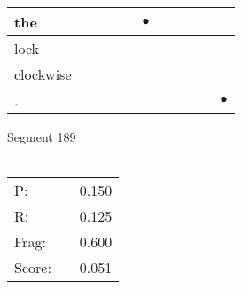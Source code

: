 \documentclass[landscape]{article}
\newcommand{\ssp}{\hspace{2pt}}
\newcommand{\mex}{\cellcolor{g}$\bullet$}
\begin{document}
\begin{tabular}{|l|p{10pt}|p{10pt}|p{10pt}|p{10pt}|p{10pt}|p{10pt}|p{10pt}|p{10pt}|p{10pt}|p{10pt}|}
\hline
\ssp \cellcolor{ref4}the \ssp&\hspace{2pt}&\hspace{2pt}&\hspace{2pt}&\hspace{2pt}&\hspace{2pt}\mex&\hspace{2pt}&\hspace{2pt}&\hspace{2pt}&\hspace{2pt}&\hspace{2pt}\\
\hline
\ssp lock \ssp&\hspace{2pt}&\hspace{2pt}&\hspace{2pt}&\hspace{2pt}&\hspace{2pt}&\hspace{2pt}&\hspace{2pt}&\hspace{2pt}&\hspace{2pt}&\hspace{2pt}\\
\hline
\ssp clockwise \ssp&\hspace{2pt}&\hspace{2pt}&\hspace{2pt}&\hspace{2pt}&\hspace{2pt}&\hspace{2pt}&\hspace{2pt}&\hspace{2pt}&\hspace{2pt}&\hspace{2pt}\\
\hline
\ssp \cellcolor{ref9}. \ssp&\hspace{2pt}&\hspace{2pt}&\hspace{2pt}&\hspace{2pt}&\hspace{2pt}&\hspace{2pt}&\hspace{2pt}&\hspace{2pt}&\hspace{2pt}&\hspace{2pt}\mex\\
\hline
\end{tabular}

\vspace{6pt}
\noindent Segment 189\\\\
\noindent\begin{tabular}{lm{12pt}r}
\hline
P:&&0.150\\
R:&&0.125\\
Frag:&&0.600\\
Score:&&0.051\\
\end{tabular}
\end{document}
